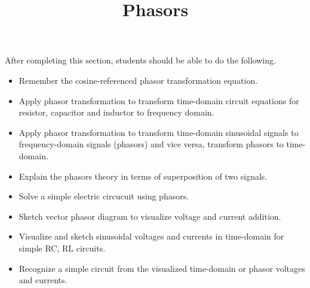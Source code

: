 \documentclass{ximera}
\title{Phasors}
\begin{document}
\begin{abstract}
\end{abstract}

\maketitle

\begin{sectionOutcomes}

After completing this section, students should be able to do the following.

\begin{itemize}
\item Remember the cosine-referenced phasor transformation equation.
\item Apply phasor transformation to transform time-domain circuit equations for resistor, capacitor and inductor to frequency domain.
\item Apply phasor transformation to transform time-domain sinusoidal signals to frequency-domain signals (phasors) and vice versa, transform phasors to time-domain.
\item Explain the phasors theory in terms of superposition of two signals.
\item Solve a simple electric circucuit using phasors.
\item Sketch vector phasor diagram to visualize voltage and current addition.
\item Visualize and sketch sinusoidal voltages and currents  in time-domain for simple RC, RL circuits.
\item Recognize a simple circuit from the visualized time-domain  or phasor voltages and currents.
\end{itemize}

\end{sectionOutcomes}
\end{document}
